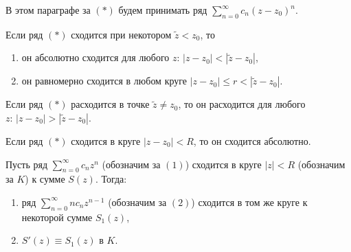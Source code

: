 
В этом параграфе за \((*)\) будем принимать ряд \(\sum\limits_{n=0}^\infty{c_n(z-z_0)^n}\).

\begin{theorem}
    Если ряд \((*)\) сходится при некотором \(\tilde{z} < z_0\), то
    \begin{enumerate}[wide=20pt, label=\arabic*., itemsep=0ex]
        \item он абсолютно сходится для любого \(z \colon \, |z-z_0|<|\tilde{z} - z_0|\),
        \item он равномерно сходится в любом круге \(|z-z_0| \le r < |\tilde{z} - z_0|\).
    \end{enumerate}
\end{theorem}

\begin{corollary}
    Если ряд \((*)\) расходится в точке \(\tilde{z} \ne z_0\), то он расходится для любого \(z 
    \colon \, |z-z_0| > |\tilde{z}-z_0|\).
\end{corollary}

\begin{corollary}
    Если ряд \((*)\) сходится в круге \(|z-z_0| < R\), то он сходится абсолютно.
\end{corollary}

\begin{statement}
    Пусть ряд \(\sum\limits_{n=0}^\infty{c_n z^n}\) (обозначим за \((1)\)) сходится в круге \(|z| <
    R\) (обозначим за \(K\)) к сумме \(S(z)\). Тогда:
    \begin{enumerate}[wide=20pt, label=\arabic*., itemsep=0ex]
        \item ряд \(\sum\limits_{n=0}^\infty{n c_n z^{n-1}}\) (обозначим за \((2)\)) сходится в том
        же круге к некоторой сумме \(S_1(z)\),
        \item \(S'(z) \equiv S_1(z)\) в \(K\).
    \end{enumerate}
\end{statement}

